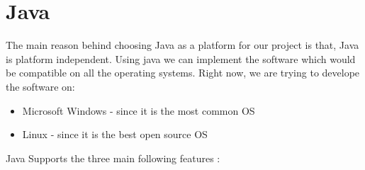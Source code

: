 \documentclass{SureshLimkar}
\begin{document}
\section{Java}
\hspace{0.5 in}The main reason behind choosing Java as a platform for our project is that, Java is platform independent. Using java we can implement the software which would be compatible on all the operating systems. Right now, we are trying to develope the software on:\\
\begin{itemize}
	\item Microsoft Windows - since it is the most common OS
	\item Linux - since it is the best open source OS
\end{itemize}
Java Supports the three main following features :
\end{document}
